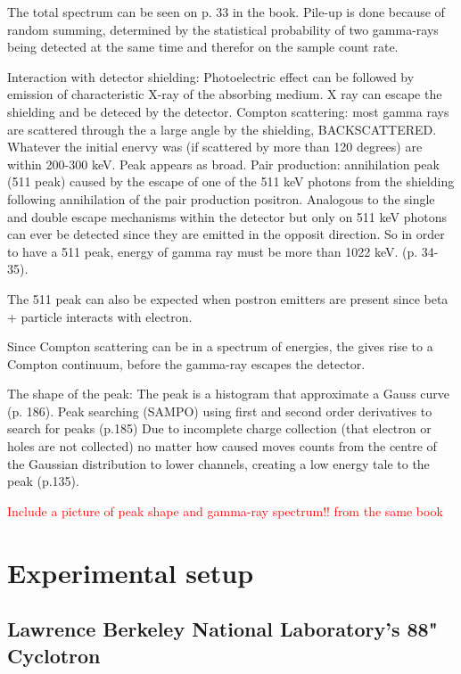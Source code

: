\documentclass[a4paper,11pt,twoside]{book}
\begin{document}
The total spectrum can be seen on p. 33 in the book. Pile-up is done because of random summing, determined by the statistical probability of two gamma-rays being detected at the same time and therefor on the sample count rate. 

Interaction with detector shielding: Photoelectric effect can be followed by emission of characteristic X-ray of the absorbing medium. X ray can escape the shielding and be deteced by the detector. Compton scattering: most gamma rays are scattered through the a large angle by the shielding, BACKSCATTERED. Whatever the initial enervy  was (if scattered by more than 120 degrees) are within 200-300 keV. Peak appears as broad. Pair production: annihilation peak (511 peak) caused by the escape of one of the 511 keV photons from the shielding following annihilation of the pair production positron. Analogous to the single and double escape mechanisms within the detector but only on 511 keV photons can ever be detected since they are emitted in the opposit direction. So in order to have a 511 peak, energy of gamma ray must be more than 1022 keV. (p. 34-35).

The 511 peak can also be expected when postron emitters are present since beta + particle interacts with electron.  

Since Compton scattering can be in a spectrum of energies, the gives rise to a Compton continuum, before the gamma-ray escapes the detector. 


The shape of the peak: The peak is a histogram that approximate a Gauss curve (p. 186). Peak searching (SAMPO) using first and second order derivatives to search for peaks (p.185)
Due to incomplete charge collection (that electron or holes are not collected) no matter how caused moves counts from the centre of the Gaussian distribution to lower channels, creating a low energy tale to the peak (p.135).  

\textcolor{red}{Include a picture of peak shape and gamma-ray spectrum!! from the same book}




\chapter{Experimental setup}

\section{Lawrence Berkeley National Laboratory's 88" Cyclotron}
\end{document}
